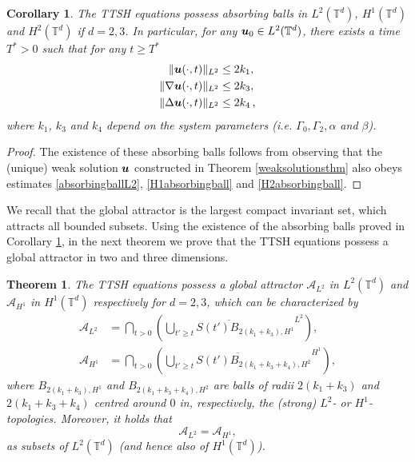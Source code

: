 \documentclass[11pt]{amsart}
\newcommand{\bu}{\mbox{\boldmath$u$}}
\newcommand{\Rb}{\beta}
\newcommand{\Att}{\mathcal{A}}
\newcommand{\Gamzero}{\Gamma_{0}}
\newcommand{\Gamtwo}{\Gamma_{2}}
\newtheorem{theorem}[proposition]{Theorem}
\newtheorem{corollary}[proposition]{Corollary}
\theoremstyle{definition}
\numberwithin{equation}{section}
\numberwithin{equation}{section}
\begin{document}
\begin{corollary} \label{absorbingballresult}
The TTSH equations possess absorbing balls in $L^2 (\mathbb{T}^d)$, $H^1 (\mathbb{T}^d)$ and $H^2 (\mathbb{T}^d)$ if $d = 2,3$. In particular, for any $\bu_0 \in L^2 (\mathbb{T}^d)$, there exists a time $T^* > 0$ such that for any $t \geq T^*$
\begin{align}
\lVert \bu (\cdot, t) \rVert_{L^2} &\leq 2 k_1, \\
\lVert \nabla \bu (\cdot, t) \rVert_{L^2} &\leq 2 k_3, \\
\lVert \Delta \bu (\cdot, t) \rVert_{L^2} &\leq 2 k_4\,,
\end{align}
where $k_1$, $k_3$ and $k_4$ depend on the system parameters (i.e. $\Gamzero,\Gamtwo,\alpha$ and $\Rb$).
\end{corollary}
\begin{proof}
The existence of these absorbing balls follows from observing that the (unique) weak solution $\bu$ constructed in Theorem \ref{weaksolutionsthm} also obeys estimates \eqref{absorbingballL2}, \eqref{H1absorbingball} and \eqref{H2absorbingball}.
\end{proof}
We recall that the global attractor is the largest compact invariant set, which attracts all bounded subsets. Using the existence of the absorbing balls proved in Corollary \ref{absorbingballresult}, in the next theorem we prove that the TTSH equations possess a global attractor in two and three dimensions.
\begin{theorem} \label{globalattractorthm}
The TTSH equations possess a global attractor $\Att_{L^2}$ in $L^2 (\mathbb{T}^d)$ and $\Att_{H^1}$ in $H^1 (\mathbb{T}^d)$ respectively for $d=2,3$, which can be characterized by 
\begin{align}
\Att_{L^2} &= \bigcap_{t > 0} \left(\overline{\bigcup_{t' \geq t} S(t') B_{2(k_1 + k_3), H^1}}^{L^2}\right), \\
\Att_{H^1} &= \bigcap_{t > 0} \left(\overline{\bigcup_{t' \geq t} S(t') B_{2(k_1 + k_3 + k_4), H^2}}^{H^1}\right),
\end{align}
where $B_{2(k_1 + k_3), H^1}$ and $B_{2(k_1 + k_3 + k_4), H^2}$ are balls of radii $2(k_1 + k_3)$ and $2(k_1 + k_3 + k_4)$ centred around $0$ in, respectively, the (strong) $L^2$- or $H^1$-topologies. Moreover, it holds that
\begin{equation}
\Att_{L^2} = \Att_{H^1},
\end{equation}
as subsets of $L^2 (\mathbb{T}^d)$ (and hence also of $H^1 (\mathbb{T}^d)$).
\end{theorem}
\end{document}
